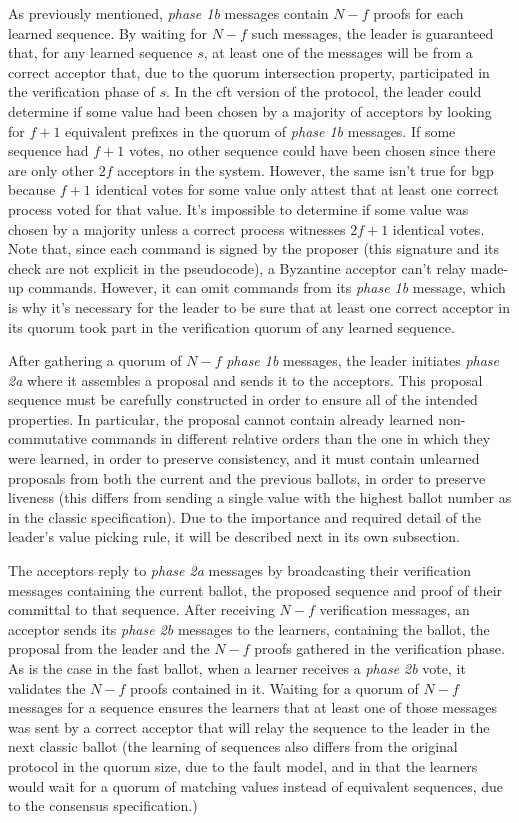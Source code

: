 As previously mentioned, \textit{phase 1b} messages contain $N-f$ proofs for each learned sequence. By waiting for $N-f$ such messages, the leader is guaranteed that, for any learned sequence $s$, at least one of the messages will be from a correct acceptor that, due to the quorum intersection property, participated in the verification phase of $s$. In the \acrshort{cft} version of the protocol, the leader could determine if some value had been chosen by a majority of acceptors by looking for $f+1$ equivalent prefixes in the quorum of \textit{phase 1b} messages. If some sequence had $f+1$ votes, no other sequence could have been chosen since there are only other $2f$ acceptors in the system. However, the same isn't true for \acrshort{bgp} because $f+1$ identical votes for some value only attest that at least one correct process voted for that value. It's impossible to determine if some value was chosen by a majority unless a correct process witnesses $2f+1$ identical votes. Note that, since each command is signed by the proposer (this signature and its check are not explicit in the pseudocode), a Byzantine acceptor can't relay made-up commands. However, it can omit commands from its \textit{phase 1b} message, which is why it's necessary for the leader to be sure that at least one correct acceptor in its quorum took part in the verification quorum of any learned sequence. \par
After gathering a quorum of $N-f$ \textit{phase 1b} messages, the leader initiates \textit{phase 2a} where it assembles a proposal and sends it to the acceptors. This proposal sequence must be carefully constructed in order to ensure all of the intended properties. In particular, the proposal cannot contain already learned non-commutative commands in different relative orders than the one in which they were learned, in order to preserve consistency, and it must contain unlearned proposals from both the current and the previous ballots, in order to preserve liveness (this differs from sending a single value with the highest ballot number as in the classic specification). Due to the importance and required detail of the leader's value picking rule, it will be described next in its own subsection. \par
The acceptors reply to \textit{phase 2a} messages by broadcasting their verification messages containing the current ballot, the proposed sequence and proof of their committal to that sequence. After receiving $N-f$ verification messages, an acceptor sends its \textit{phase 2b} messages to the learners, containing the ballot, the proposal from the leader and the $N-f$ proofs gathered in the verification phase. As is the case in the fast ballot, when a learner receives a \textit{phase 2b} vote, it validates the $N-f$ proofs contained in it. Waiting for a quorum of $N-f$ messages for a sequence ensures the learners that at least one of those messages was sent by a correct acceptor that will relay the sequence to the leader in the next classic ballot (the learning of sequences also differs from the original protocol in the quorum size, due to the fault model, and in that the learners would wait for a quorum of matching values instead of equivalent sequences, due to the consensus specification.)\par

